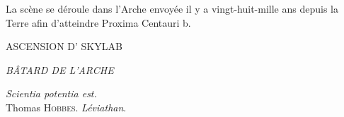 \documentclass[a4paper,12pt,twoside,french]{book}
\begin{document}
\begin{titlepage}
\begin{center}
\begin{adjustwidth}{3.5cm}{3.5cm}
        \begin{center}
        La scène se déroule dans l’Arche envoyée il y a vingt-huit-mille ans depuis la Terre afin d’atteindre Proxima Centauri b.
        \end{center}
      \end{adjustwidth}


      \makeatletter
        \vspace{0cm}\large \@author

      \vspace{.5cm}\large \@date
      \makeatother


      \vspace*{2cm}
      \vfill
    \end{center}
    \restoregeometry
  \end{titlepage}


  \frontmatter


  \thispagestyle{empty}
  \null\vfill           %

  \begin{center}
    {

      {
        \Huge
        \MakeUppercase{
          Ascension d’\elena{} skylab}
          \vspace{0.5em}
          
          \MakeUppercase{{\em{}bâtard de l’Arche}
        }
      }

      {
        \vspace{2em}
        \large
        \begin{flushright}
          {\em Scientia potentia est.}\\
%
          {\normalsize Thomas \textsc{Hobbes}. {\em Léviathan}.}
        \end{flushright}
      }
    }
  \end{center}
\end{document}
